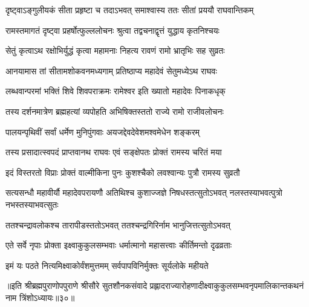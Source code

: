 \twolineshloka
{दृष्ट्वाऽङ्गुलीयकं सीता प्रहृष्टा च तदाऽभवत्}
{समाश्वास्य ततः सीतां प्रययौ राघवान्तिकम्} %

\twolineshloka
{रामस्तमागतं दृष्ट्वा प्रहर्षोत्फुल्ललोचनः}
{श्रुत्वा तद्वचनाद्वृत्तं युद्धाय कृतनिश्चयः} %

\twolineshloka
{सेतुं कृत्वाऽथ रक्षोभिर्युद्धं कृत्वा महामनाः}
{निहत्य रावणं रामो भ्रातृभिः सह सुव्रतः} %

\twolineshloka
{आनयामास तां सीतामशोकवनमध्यगाम्}
{प्रतिष्ठाप्य महादेवं सेतुमध्येऽथ राघवः} %

\twolineshloka
{लब्धवान्परमां भक्तिं शिवे शिवपराक्रमः}
{रामेश्वर इति ख्यातो महादेवः पिनाकधृक्} %

\twolineshloka
{तस्य दर्शनमात्रेण ब्रह्महत्यां व्यपोहति}
{अभिषिक्तस्ततो राज्ये रामो राजीवलोचनः} %

\twolineshloka
{पालयन्पृथिवीं सर्वां धर्मेण मुनिपुंगवाः}
{अयजद्देवदेवेशमश्वमेधेन शङ्करम्} %

\twolineshloka
{तस्य प्रसादात्स्वपदं प्राप्तवानथ राघवः}
{एवं सङ्क्षेपतः प्रोक्तं रामस्य चरितं मया} %

\twolineshloka
{इदं विस्तरतो विप्राः प्रोक्तं वाल्मीकिना पुनः}
{कुशश्चैको लवश्वान्यः पुत्रौ रामस्य सुव्रतौ} %

\threelineshloka
{सत्यसन्धौ महावीर्यौ महादेवपरायणौ}
{अतिथिश्च कुशाज्जज्ञे निषधस्तत्सुतोऽभवत्}
{नलस्तस्याभवत्पुत्रो नभस्तस्याभवत्सुतः} %

\twolineshloka
{ततश्चन्द्रावलोकश्च तारापीडस्ततोऽभवत्}
{ततश्चन्द्रगिरिर्नाम भानुजित्तत्सुतोऽभवत्} %

\twolineshloka
{एते सर्वे नृपाः प्रोक्ता इक्ष्वाकुकुलसम्भवाः}
{धर्मात्मानो महासत्त्वाः कीर्तिमन्तो दृढव्रताः} %

\twolineshloka
{इमं यः पठते नित्यमिक्ष्वाकोर्वंशमुत्तमम्}
{सर्वपापविनिर्मुक्तः सूर्यलोके महीयते} %

॥इति श्रीब्रह्मपुराणोपपुराणे श्रीसौरे सुतशौनकसंवादे प्रह्लादराज्यारोहणादीक्ष्वाकुकुलसम्भवनृपमालिकान्तकथनं नाम त्रिंशोऽध्यायः॥३०॥

\closesection